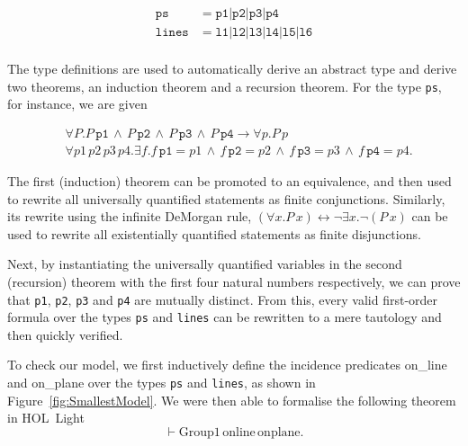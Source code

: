 \documentclass{article}
\renewcommand{\implies}{\longrightarrow}
\renewcommand{\iff}{\longleftrightarrow}
\begin{document}
\begin{align*}
\texttt{ps}   &= \texttt{p1} \vert \texttt{p2} \vert\texttt{p3} \vert\texttt{p4}\\
\texttt{lines}&= \texttt{l1} \vert \texttt{l2} \vert\texttt{l3} \vert\texttt{l4} \vert\texttt{l5} \vert\texttt{l6}\\
\end{align*}

The type definitions are used to automatically derive an abstract type and derive two theorems, an induction theorem and a recursion theorem. For the type \texttt{ps}, for instance, we are given

\begin{align*}
&\forall P. P\,\texttt{p1}\,\wedge\,P\,\texttt{p2}\,\wedge\,P\,\texttt{p3}\,\wedge\,P\,\texttt{p4}\implies\forall p. P\,p\\
&\forall p1\,p2\,p3\,p4. \exists f. f\,\texttt{p1} = p1\,\wedge\,f\,\texttt{p2} = p2\,\wedge\,f\,\texttt{p3} = p3\,\wedge\,f\,\texttt{p4} = p4.
\end{align*}

The first (induction) theorem can be promoted to an equivalence, and then used to rewrite all universally quantified statements as finite conjunctions. Similarly, its rewrite using the infinite DeMorgan rule, $(\forall x. P\,x) \iff \neg\exists x. \neg (P\,x)$ can be used to rewrite all existentially quantified statements as finite disjunctions.

Next, by instantiating the universally quantified variables in the second (recursion) theorem with the first four natural numbers respectively, we can prove that \texttt{p1}, \texttt{p2}, \texttt{p3} and \texttt{p4} are mutually distinct. From this, every valid first-order formula over the types \texttt{ps} and \texttt{lines} can be rewritten to a mere tautology and then quickly verified.

To check our model, we first inductively define the incidence predicates on\_line and on\_plane over the types \texttt{ps} and \texttt{lines}, as shown in Figure~\ref{fig:SmallestModel}. We were then able to formalise the following theorem in HOL~Light 
\begin{displaymath}
\vdash \text{Group1}\,\text{online}\,\text{onplane}.
\end{displaymath}
\end{document}
